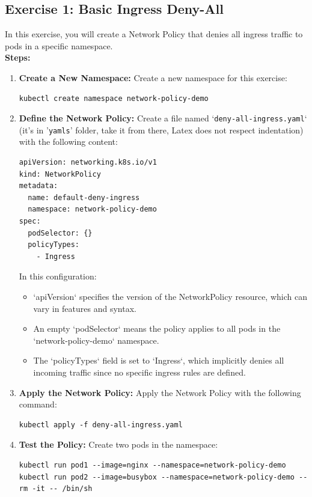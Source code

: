 \documentclass{article}
\begin{document}
\subsection{Exercise 1: Basic Ingress Deny-All}

In this exercise, you will create a Network Policy that denies all ingress traffic to pods in a specific namespace. \\

\textbf{Steps:}

\begin{enumerate}
    \item \textbf{Create a New Namespace:}
    Create a new namespace for this exercise:
    \begin{lstlisting}
kubectl create namespace network-policy-demo
    \end{lstlisting}

    \item \textbf{Define the Network Policy:}
    Create a file named `\texttt{deny-all-ingress.yaml}` (it's in '\texttt{yamls}' folder, take it from there, Latex does not respect indentation) with the following content:
    \begin{lstlisting}
apiVersion: networking.k8s.io/v1
kind: NetworkPolicy
metadata:
  name: default-deny-ingress
  namespace: network-policy-demo
spec:
  podSelector: {}
  policyTypes:
    - Ingress
    \end{lstlisting}
    In this configuration:
    \begin{itemize}
        \item `apiVersion` specifies the version of the NetworkPolicy resource, which can vary in features and syntax.
        \item An empty `podSelector` means the policy applies to all pods in the `network-policy-demo` namespace.
        \item The `policyTypes` field is set to `Ingress`, which implicitly denies all incoming traffic since no specific ingress rules are defined.
    \end{itemize}

    \item \textbf{Apply the Network Policy:}
    Apply the Network Policy with the following command:
    \begin{lstlisting}
kubectl apply -f deny-all-ingress.yaml
    \end{lstlisting}

    \item \textbf{Test the Policy:}
    Create two pods in the namespace:
    \begin{lstlisting}
kubectl run pod1 --image=nginx --namespace=network-policy-demo
kubectl run pod2 --image=busybox --namespace=network-policy-demo --rm -it -- /bin/sh
    \end{lstlisting}


\end{enumerate}
\end{document}

